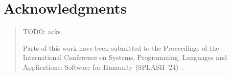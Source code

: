 
\begingroup
\let\raggedsection\centering

\chapter*{Acknowledgments}
\label{cha:acknowledgments}
\endgroup
\begin{quotation}
	\noindent TODO: acks

	\ParSep

	Parts of this work have been submitted to the Proceedings of the International Conference on Systems, Programming, Languages and Applications: Software for Humanity (SPLASH '24)~\cite{thiede2024talking}.
\end{quotation}
